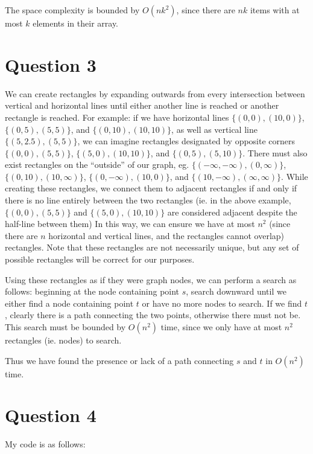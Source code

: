 \documentclass[12pt]{article}
\begin{document}
The space complexity is bounded by $O(nk^2)$, since there are $nk$ items with at most $k$ elements in their array.

\section*{Question 3}
We can create rectangles by expanding outwards from every intersection between vertical and horizontal lines until either another line is reached or another rectangle is reached. For example: if we have horizontal lines $\{(0, 0), (10, 0)\}$, $\{(0, 5), (5, 5)\}$, and $\{(0, 10), (10, 10)\}$, as well as vertical line $\{(5, 2.5), (5, 5)\}$, we can imagine rectangles designated by opposite corners $\{(0, 0), (5, 5)\}$, $\{(5, 0), (10, 10)\}$, and $\{(0, 5), (5, 10)\}$. There must also exist rectangles on the ``outside'' of our graph, eg. $\{(-\infty, -\infty), (0, \infty)\}$, $\{(0, 10), (10, \infty)\}$, $\{(0, -\infty), (10, 0)\}$, and $\{(10, -\infty), (\infty, \infty)\}$. While creating these rectangles, we connect them to adjacent rectangles if and only if there is no line entirely between the two rectangles (ie. in the above example, $\{(0, 0), (5, 5)\}$ and $\{(5, 0), (10, 10)\}$ are considered adjacent despite the half-line between them) In this way, we can ensure we have at most $n^2$ (since there are $n$ horizontal and vertical lines, and the rectangles cannot overlap) rectangles. Note that these rectangles are not necessarily unique, but any set of possible rectangles will be correct for our purposes.

Using these rectangles as if they were graph nodes, we can perform a search as follows: beginning at the node containing point $s$, search downward until we either find a node containing point $t$ or have no more nodes to search. If we find $t$, clearly there is a path connecting the two points, otherwise there must not be. This search must be bounded by $O(n^2)$ time, since we only have at most $n^2$ rectangles (ie. nodes) to search.

Thus we have found the presence or lack of a path connecting $s$ and $t$ in $O(n^2)$ time.

\section*{Question 4}
My code is as follows:

\end{document}
